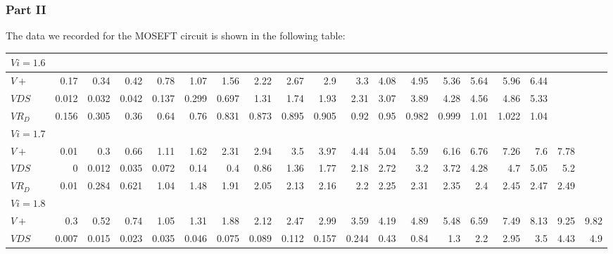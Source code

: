     \subsubsection{Part II}
    The data we recorded for the MOSEFT circuit is shown in the following table:
    \begin{table}[H]
        \centering
\begin{tabular}{l|rrrrrrrrrrrrrrrrrr}
    \midrule
    $Vi=1.6 $  &       &       &       &       &       &       &       &       &       &       &       &       &       &       &       &       &       &  \\
    \midrule
    $V+     $ & 0.17  & 0.34  & 0.42  & 0.78  & 1.07  & 1.56  & 2.22  & 2.67  & 2.9   & 3.3   & 4.08  & 4.95  & 5.36  & 5.64  & 5.96  & 6.44  &       &  \\
    $VDS    $ & 0.012 & 0.032 & 0.042 & 0.137 & 0.299 & 0.697 & 1.31  & 1.74  & 1.93  & 2.31  & 3.07  & 3.89  & 4.28  & 4.56  & 4.86  & 5.33  &       &  \\
    $VR_D   $ & 0.156 & 0.305 & 0.36  & 0.64  & 0.76  & 0.831 & 0.873 & 0.895 & 0.905 & 0.92  & 0.95  & 0.982 & 0.999 & 1.01  & 1.022 & 1.04  &       &  \\
\midrule \midrule
    $Vi=1.7 $  &       &       &       &       &       &       &       &       &       &       &       &       &       &       &       &       &       &  \\
    $V+     $ & 0.01  & 0.3   & 0.66  & 1.11  & 1.62  & 2.31  & 2.94  & 3.5   & 3.97  & 4.44  & 5.04  & 5.59  & 6.16  & 6.76  & 7.26  & 7.6   & 7.78  &  \\
    $VDS    $ & 0     & 0.012 & 0.035 & 0.072 & 0.14  & 0.4   & 0.86  & 1.36  & 1.77  & 2.18  & 2.72  & 3.2   & 3.72  & 4.28  & 4.7   & 5.05  & 5.2   &  \\
    $VR_D   $ & 0.01  & 0.284 & 0.621 & 1.04  & 1.48  & 1.91  & 2.05  & 2.13  & 2.16  & 2.2   & 2.25  & 2.31  & 2.35  & 2.4   & 2.45  & 2.47  & 2.49  &  \\
    \midrule
    \midrule
    $Vi=1.8 $  &       &       &       &       &       &       &       &       &       &       &       &       &       &       &       &       &       &  \\
    $V+     $ & 0.3   & 0.52  & 0.74  & 1.05  & 1.31  & 1.88  & 2.12  & 2.47  & 2.99  & 3.59  & 4.19  & 4.89  & 5.48  & 6.59  & 7.49  & 8.13  & 9.25  & 9.82 \\
    $VDS    $ & 0.007 & 0.015 & 0.023 & 0.035 & 0.046 & 0.075 & 0.089 & 0.112 & 0.157 & 0.244 & 0.43  & 0.84  & 1.3   & 2.2   & 2.95  & 3.5   & 4.43  & 4.9 \\

\end{tabular}
\end{table}
